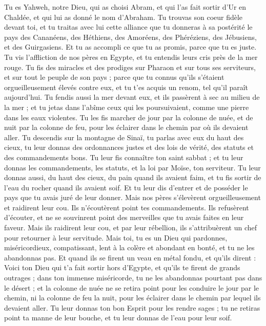 \begin{multicols}{2}
Tu es Yahweh, notre Dieu, qui as choisi Abram, et qui l’as fait sortir d'Ur en Chaldée, et qui lui as donné le nom d'Abraham.
Tu trouvas son coeur fidèle devant toi, et tu traitas avec lui cette alliance que tu donneras à sa postérité le pays des Cananéens, des Héthiens, des Amoréens, des Phéréziens, des Jébusiens, et des Guirgasiens. Et tu as accompli ce que tu as promis, parce que tu es juste.
Tu vis l'affliction de nos pères en Egypte, et tu entendis leurs cris près de la mer rouge.
Tu fis des miracles et des prodiges sur Pharaon et sur tous ses serviteurs, et sur tout le peuple de son pays ; parce que tu connus qu'ils s'étaient orgueilleusement élevés contre eux, et tu t'es acquis un renom, tel qu'il paraît aujourd'hui.
Tu fendis aussi la mer devant eux, et ils passèrent à sec au milieu de la mer ; et tu jetas dans l’abîme ceux qui les poursuivaient, comme une pierre dans les eaux violentes.
Tu les fis marcher de jour par la colonne de nuée, et de nuit par la colonne de feu, pour les éclairer dans le chemin par où ils devaient aller.
Tu descendis sur la montagne de Sinaï, tu parlas avec eux du haut des cieux, tu leur donnas des ordonnances justes et des lois de vérité, des statuts et des commandements bons.
Tu leur fis connaître ton saint sabbat ; et tu leur donnas les commandements, les statuts, et la loi par Moïse, ton serviteur.
Tu leur donnas aussi, du haut des cieux, du pain quand ils avaient faim, et tu fis sortir de l'eau du rocher quand ils avaient soif. Et tu leur dis d’entrer et de posséder le pays que tu avais juré de leur donner.
Mais nos pères s’élevèrent orgueilleusement et raidirent leur cou. Ils n’écoutèrent point tes commandements.
Ils refusèrent d'écouter, et ne se souvinrent point des merveilles que tu avais faites en leur faveur. Mais ils raidirent leur cou, et par leur rébellion, ils s'attribuèrent un chef pour retourner à leur servitude. Mais toi, tu es un Dieu qui  pardonnes, miséricordieux, compatissant, lent à la colère et abondant en bonté, et tu ne les abandonnas pas.
Et quand ils se firent un veau en métal fondu, et qu'ils dirent : Voici ton Dieu qui t'a fait sortir hors d'Egypte, et qu'ils te firent de grands outrages ;
dans ton immense miséricorde, tu ne les abandonnas pourtant pas dans le désert ; et la colonne de nuée ne se retira point pour les conduire le jour par le chemin, ni la colonne de feu la nuit, pour les éclairer dans le chemin par lequel ils devaient aller.
Tu leur donnas ton bon Esprit pour les rendre sages ; tu ne retiras point ta manne de leur bouche, et tu leur donnas de l'eau pour leur soif.

\end{multicols}
